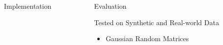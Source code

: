 \documentclass[final]{beamer}
\begin{document}
{\begin{frame}{}
\begin{center}
\begin{columns}[t]
\begin{column}{0.32\textwidth}
\begin{block}{\huge Implementation}
    \end{block}


\end{column}

\begin{column}{0.32\textwidth}

       \begin{block}{\huge Evaluation}

\vspace{1cm}
{\Large Tested on Synthetic and Real-world Data}
\begin{itemize}
\item Gaussian Random Matrices
\end{itemize}
\end{block}
\end{column}
\end{columns}
\end{center}
\end{frame}}
\end{document}
